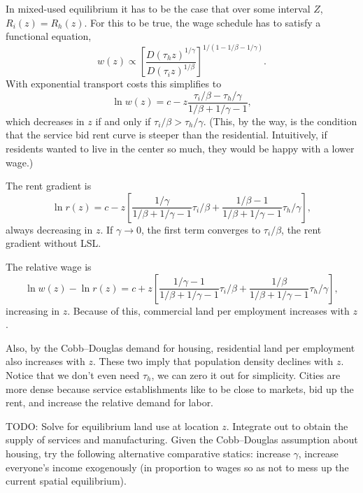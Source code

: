 \documentclass[10pt]{article}
\begin{document}
In mixed-used equilibrium it has to be the case that over some interval $Z$, $R_i(z)=R_h(z)$. For this to be true, the wage schedule has to satisfy a functional equation,
\[
w(z) \propto \left[\frac{D(\tau_hz)^{1/\gamma}}{D(\tau_iz)^{1/\beta}}\right]^{1/(1-1/\beta-1/\gamma)}.
\]
With exponential transport costs this simplifies to
\[
\ln w(z) = c - z\frac{\tau_i/\beta-\tau_h/\gamma}{1/\beta+1/\gamma-1},
\]
which decreases in $z$ if and only if $\tau_i/\beta > \tau_h/\gamma$. (This, by the way, is the condition that the service bid rent curve is steeper than the residential. Intuitively, if residents wanted to live in the center so much, they would be happy with a lower wage.)

The rent gradient is
\[
\ln r(z) = c - z\left[\frac{1/\gamma}{1/\beta+1/\gamma-1}\tau_i/\beta+
\frac{1/\beta-1}{1/\beta+1/\gamma-1}\tau_h/\gamma\right],
\]
always decreasing in $z$. If $\gamma\to 0$, the first term converges to $\tau_i/\beta$, the rent gradient without LSL. 

The relative wage is
\[
\ln w(z) - \ln r(z) = c + z\left[\frac{1/\gamma-1}{1/\beta+1/\gamma-1}\tau_i/\beta+
\frac{1/\beta}{1/\beta+1/\gamma-1}\tau_h/\gamma\right],
\]
increasing in $z$. Because of this, commercial land per employment increases with $z$. 

Also, by the Cobb--Douglas demand for housing, residential land per employment also increases with $z$. These two imply that population density declines with $z$. Notice that we don't even need $\tau_h$, we can zero it out for simplicity. Cities are more dense because service establishments like to be close to markets, bid up the rent, and increase the relative demand for labor.

TODO: Solve for equilibrium land use at location $z$. Integrate out to obtain the supply of services and manufacturing. Given the Cobb--Douglas assumption about housing, try the following alternative comparative statics: increase $\gamma$, increase everyone's income exogenously (in proportion to wages so as not to mess up the current spatial equilibrium).
\end{document}
